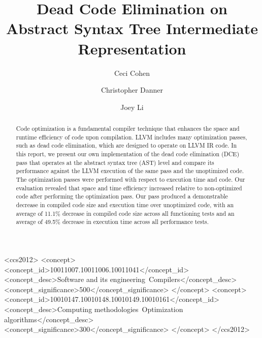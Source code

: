 \documentclass[sigconf]{acmart}
\begin{document}
\title{Dead Code Elimination on Abstract Syntax Tree Intermediate Representation}

\author{Ceci Cohen}

\author{Christopher Danner}
\author{Joey Li}

\begin{abstract}
  Code optimization is a fundamental compiler technique that enhances the space and runtime efficiency of code upon compilation. LLVM includes many optimization passes, such as dead code elimination, which are designed to operate on LLVM IR code. In this report, we present our own implementation of the dead code elimination (DCE) pass that operates at the abstract syntax tree (AST) level and compare its performance against the LLVM execution of the same pass and the unoptimized code. The optimization passes were performed with respect to execution time and code. Our evaluation revealed that space and time efficiency increased relative to non-optimized code after performing the optimization pass. Our pass produced a demonstrable decrease in compiled code size and execution time over unoptimized code, with an average of 11.1\% decrease in compiled code size across all functioning tests and an average of 49.5\% decrease in execution time across all performance tests.
\end{abstract}


\begin{CCSXML}
<ccs2012>
<concept>
<concept_id>10011007.10011006.10011041</concept_id>
<concept_desc>Software and its engineering~Compilers</concept_desc>
<concept_significance>500</concept_significance>
</concept>
<concept>
<concept_id>10010147.10010148.10010149.10010161</concept_id>
<concept_desc>Computing methodologies~Optimization algorithms</concept_desc>
<concept_significance>300</concept_significance>
</concept>
</ccs2012>
\end{CCSXML}
\end{document}
